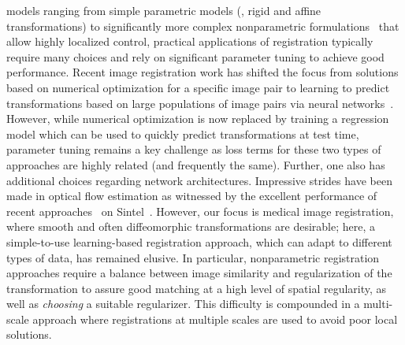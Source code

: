 models ranging from simple parametric models (\eg, rigid and affine
transformations) to significantly more complex nonparametric
formulations~\cite{modersitzki2003numerical,miller2006geodesic,vialard2012diffeomorphic}
that allow highly localized control, practical applications of registration
typically require many choices and rely on significant parameter tuning to
achieve good performance.
Recent image registration work has shifted the focus from solutions based on numerical optimization for a specific image pair to learning to predict transformations based on large populations of image pairs via neural networks~\cite{yang2017quicksilver,dalca2018unsupervised,chen2021deep,ilg2017flownet,dosovitskiy2015flownet,sun2018pwc,teed2020raft,huang2022flowformer}. However, while numerical optimization is now replaced by training a regression model which can be used to quickly predict transformations at test time, parameter tuning remains a key challenge as loss terms for these two types of approaches are highly related (and frequently the same). Further, one also has additional choices regarding network architectures. Impressive strides have been made in optical flow estimation as witnessed by the excellent performance of recent approaches~\cite{huang2022flowformer} on Sintel~\cite{butler2012naturalistic}. However, our focus is medical image registration, where smooth and often diffeomorphic transformations are desirable; here, a simple-to-use learning-based registration approach, which can adapt to different types of data, has remained elusive. In particular, nonparametric registration approaches require a balance between image similarity and regularization of the transformation to assure good matching at a high level of spatial regularity, as well as \emph{choosing} a suitable regularizer. This difficulty is compounded in a multi-scale approach where registrations at multiple scales are used to avoid poor local solutions.

